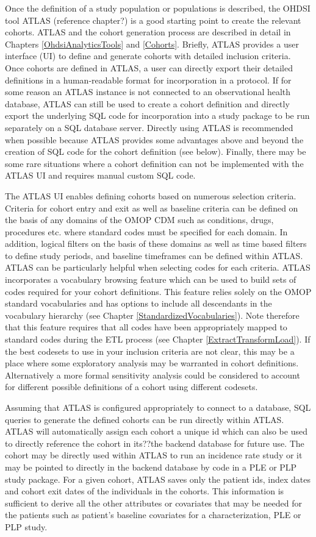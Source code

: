 \documentclass[11pt]{book}
\theoremstyle{definition}
\theoremstyle{definition}
\theoremstyle{definition}
\theoremstyle{remark}
\begin{document}
Once the definition of a study population or populations is described, the OHDSI tool ATLAS (reference chapter?) is a good starting point to create the relevant cohorts. ATLAS and the cohort generation process are described in detail in Chapters \ref{OhdsiAnalyticsTools} and \ref{Cohorts}. Briefly, ATLAS provides a user interface (UI) to define and generate cohorts with detailed inclusion criteria. Once cohorts are defined in ATLAS, a user can directly export their detailed definitions in a human-readable format for incorporation in a protocol. If for some reason an ATLAS instance is not connected to an observational health database, ATLAS can still be used to create a cohort definition and directly export the underlying SQL code for incorporation into a study package to be run separately on a SQL database server. Directly using ATLAS is recommended when possible because ATLAS provides some advantages above and beyond the creation of SQL code for the cohort definition (see below). Finally, there may be some rare situations where a cohort definition can not be implemented with the ATLAS UI and requires manual custom SQL code.

The ATLAS UI enables defining cohorts based on numerous selection criteria. Criteria for cohort entry and exit as well as baseline criteria can be defined on the basis of any domains of the OMOP CDM such as conditions, drugs, procedures etc. where standard codes must be specified for each domain. In addition, logical filters on the basis of these domains as well as time based filters to define study periods, and baseline timeframes can be defined within ATLAS. ATLAS can be particularly helpful when selecting codes for each criteria. ATLAS incorporates a vocabulary browsing feature which can be used to build sets of codes required for your cohort definitions. This feature relies solely on the OMOP standard vocabularies and has options to include all descendants in the vocabulary hierarchy (see Chapter \ref{StandardizedVocabularies}). Note therefore that this feature requires that all codes have been appropriately mapped to standard codes during the ETL process (see Chapter \ref{ExtractTransformLoad}).
If the best codesets to use in your inclusion criteria are not clear, this may be a place where some exploratory analysis may be warranted in cohort definitions. Alternatively a more formal sensitivity analysis could be considered to account for different possible definitions of a cohort using different codesets.

Assuming that ATLAS is configured appropriately to connect to a database, SQL queries to generate the defined cohorts can be run directly within ATLAS. ATLAS will automatically assign each cohort a unique id which can also be used to directly reference the cohort in its??the backend database for future use. The cohort may be directly used within ATLAS to run an incidence rate study or it may be pointed to directly in the backend database by code in a PLE or PLP study package. For a given cohort, ATLAS saves only the patient ids, index dates and cohort exit dates of the individuals in the cohorts. This information is sufficient to derive all the other attributes or covariates that may be needed for the patients such as patient's baseline covariates for a characterization, PLE or PLP study.
\end{document}

